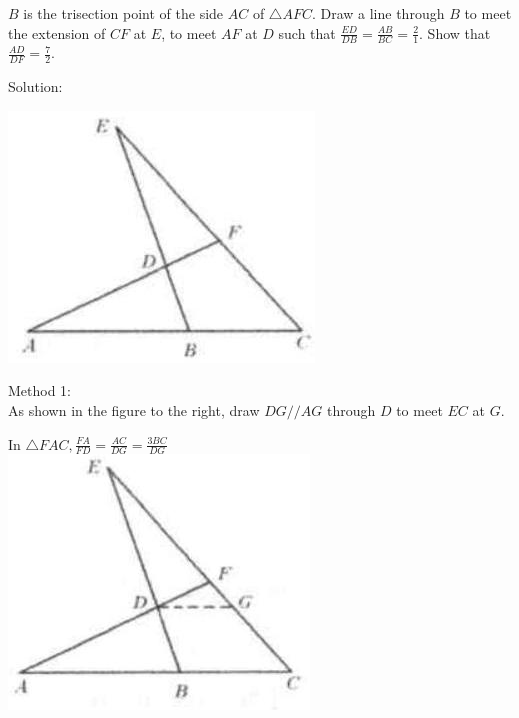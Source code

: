 \documentclass{article}
\begin{document}
\(B\) is the trisection point of the side \(A C\) of \(\triangle A F C\). Draw a line through \(B\) to meet the extension of \(C F\) at \(E\), to meet \(A F\) at \(D\) such that \(\frac{E D}{D B}=\frac{A B}{B C}=\frac{2}{1}\). Show that \(\frac{A D}{D F}=\frac{7}{2}\).

Solution:
\begin{center}
\includegraphics[width=\textwidth]{images/111(3).jpg}
\end{center}

Method 1:\\
As shown in the figure to the right, draw \(D G / / A G\) through \(D\) to meet \(E C\) at \(G\).

In \(\triangle F A C, \frac{F A}{F D}=\frac{A C}{D G}=\frac{3 B C}{D G}\)\\
\centering
\includegraphics[width=\textwidth]{images/111(2).jpg}
\end{document}
